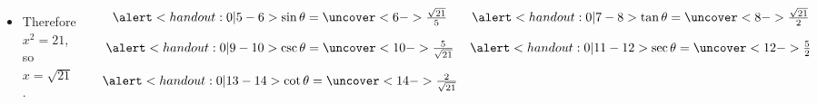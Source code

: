 \begin{frame}
\begin{example}
\begin{columns}[c]
\begin{itemize}
\item<4->  Therefore $x^2 = 21$, so $x = \sqrt{21}$.
\end{itemize}
\[
\begin{array}{cc}
\alert<handout:0| 5-6>{%
\sin \theta = %
\uncover<6->{%
\frac{\sqrt{21}}{5}%
}}&%
\alert<handout:0| 7-8>{%
\tan \theta = %
\uncover<8->{%
\frac{\sqrt{21}}{2}%
}}\\%
& \\
\alert<handout:0| 9-10>{%
\csc \theta = %
\uncover<10->{%
\frac{5}{\sqrt{21}}%
}}&%
\alert<handout:0| 11-12>{%
\sec \theta = %
\uncover<12->{%
\frac{5}{2}%
}}\\%
& \\
\alert<handout:0| 13-14>{%
\cot \theta = %
\uncover<14->{%
\frac{2}{\sqrt{21}}%
}}&%
\end{array}
\]
\end{columns}
\end{example}
\end{frame}
